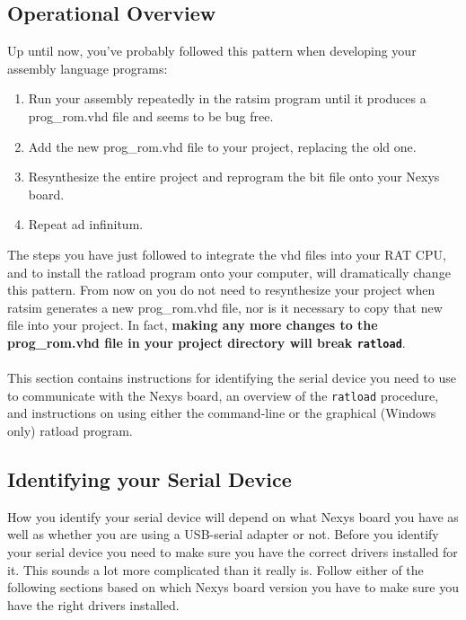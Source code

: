 \documentclass[notitlepage]{article}
\begin{document}
\subsection{Operational Overview}
Up until now, you've probably followed this pattern when developing your assembly language programs:
\begin{enumerate}
\item Run your assembly repeatedly in the ratsim program until it produces a prog\_rom.vhd file and seems to be bug free.
\item Add the new prog\_rom.vhd file to your project, replacing the old one.
\item Resynthesize the entire project and reprogram the bit file onto your Nexys board.
\item Repeat ad infinitum.
\end{enumerate}
The steps you have just followed to integrate the vhd files into your RAT CPU, and to install the ratload program onto your computer, will dramatically change this pattern. From now on you do not need to resynthesize your project when ratsim generates a new prog\_rom.vhd file, nor is it necessary to copy that new file into your project. In fact, \textbf{making any more changes to the prog\_rom.vhd file in your project directory will break \texttt{ratload}}.\\\\
This section contains instructions for identifying the serial device you need to use to communicate with the Nexys board, an overview of the \texttt{ratload} procedure, and instructions on using either the command-line or the graphical (Windows only) ratload program.

\subsection{Identifying your Serial Device}
\label{sec:serial_id}
How you identify your serial device will depend on what Nexys board you have as well as whether you are using a USB-serial adapter or not. Before you identify your serial device you need to make sure you have the correct drivers installed for it. This sounds a lot more complicated than it really is. Follow either of the following sections based on which Nexys board version you have to make sure you have the right drivers installed.
\end{document}
